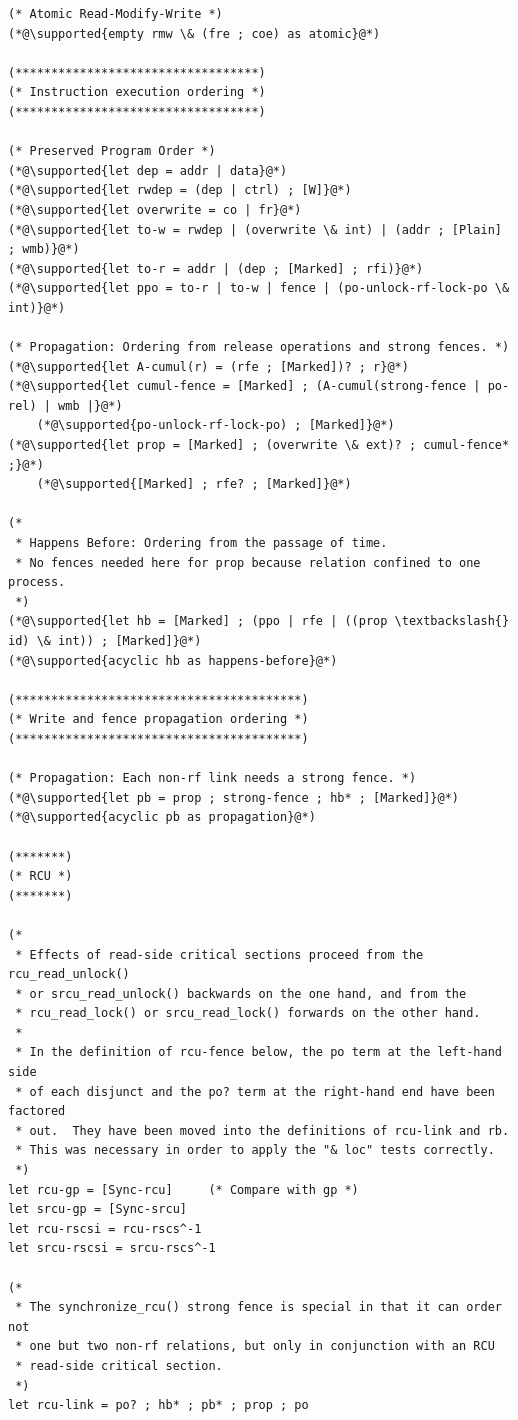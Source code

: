 \begin{lstlisting}
(* Atomic Read-Modify-Write *)
(*@\supported{empty rmw \& (fre ; coe) as atomic}@*)

(**********************************)
(* Instruction execution ordering *)
(**********************************)

(* Preserved Program Order *)
(*@\supported{let dep = addr | data}@*)
(*@\supported{let rwdep = (dep | ctrl) ; [W]}@*)
(*@\supported{let overwrite = co | fr}@*)
(*@\supported{let to-w = rwdep | (overwrite \& int) | (addr ; [Plain] ; wmb)}@*)
(*@\supported{let to-r = addr | (dep ; [Marked] ; rfi)}@*)
(*@\supported{let ppo = to-r | to-w | fence | (po-unlock-rf-lock-po \& int)}@*)

(* Propagation: Ordering from release operations and strong fences. *)
(*@\supported{let A-cumul(r) = (rfe ; [Marked])? ; r}@*)
(*@\supported{let cumul-fence = [Marked] ; (A-cumul(strong-fence | po-rel) | wmb |}@*)
	(*@\supported{po-unlock-rf-lock-po) ; [Marked]}@*)
(*@\supported{let prop = [Marked] ; (overwrite \& ext)? ; cumul-fence* ;}@*)
	(*@\supported{[Marked] ; rfe? ; [Marked]}@*)

(*
 * Happens Before: Ordering from the passage of time.
 * No fences needed here for prop because relation confined to one process.
 *)
(*@\supported{let hb = [Marked] ; (ppo | rfe | ((prop \textbackslash{} id) \& int)) ; [Marked]}@*)
(*@\supported{acyclic hb as happens-before}@*)

(****************************************)
(* Write and fence propagation ordering *)
(****************************************)

(* Propagation: Each non-rf link needs a strong fence. *)
(*@\supported{let pb = prop ; strong-fence ; hb* ; [Marked]}@*)
(*@\supported{acyclic pb as propagation}@*)

(*******)
(* RCU *)
(*******)

(*
 * Effects of read-side critical sections proceed from the rcu_read_unlock()
 * or srcu_read_unlock() backwards on the one hand, and from the
 * rcu_read_lock() or srcu_read_lock() forwards on the other hand.
 *
 * In the definition of rcu-fence below, the po term at the left-hand side
 * of each disjunct and the po? term at the right-hand end have been factored
 * out.  They have been moved into the definitions of rcu-link and rb.
 * This was necessary in order to apply the "& loc" tests correctly.
 *)
let rcu-gp = [Sync-rcu]		(* Compare with gp *)
let srcu-gp = [Sync-srcu]
let rcu-rscsi = rcu-rscs^-1
let srcu-rscsi = srcu-rscs^-1

(*
 * The synchronize_rcu() strong fence is special in that it can order not
 * one but two non-rf relations, but only in conjunction with an RCU
 * read-side critical section.
 *)
let rcu-link = po? ; hb* ; pb* ; prop ; po


\end{lstlisting}
